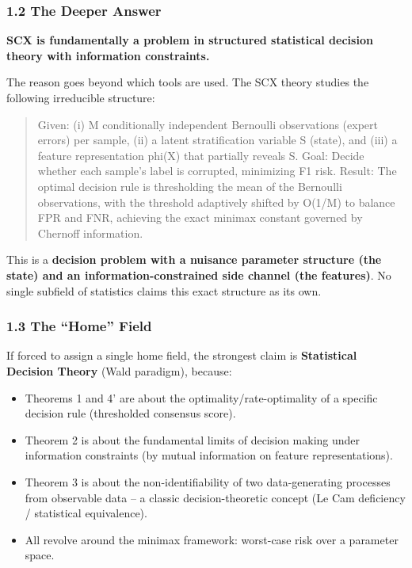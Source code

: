 \documentclass[
  12pt,
]{article}
\providecommand{\tightlist}{%
  \setlength{\itemsep}{0pt}\setlength{\parskip}{0pt}}
\begin{document}
\subsubsection{1.2 The Deeper Answer}\label{the-deeper-answer}

\textbf{SCX is fundamentally a problem in structured statistical
decision theory with information constraints.}

The reason goes beyond which tools are used. The SCX theory studies the
following irreducible structure:

\begin{quote}
Given: (i) M conditionally independent Bernoulli observations (expert
errors) per sample, (ii) a latent stratification variable S (state), and
(iii) a feature representation phi(X) that partially reveals S. Goal:
Decide whether each sample's label is corrupted, minimizing F1 risk.
Result: The optimal decision rule is thresholding the mean of the
Bernoulli observations, with the threshold adaptively shifted by O(1/M)
to balance FPR and FNR, achieving the exact minimax constant governed by
Chernoff information.
\end{quote}

This is a \textbf{decision problem with a nuisance parameter structure
(the state) and an information-constrained side channel (the features)}.
No single subfield of statistics claims this exact structure as its own.

\subsubsection{1.3 The ``Home'' Field}\label{the-home-field}

If forced to assign a single home field, the strongest claim is
\textbf{Statistical Decision Theory} (Wald paradigm), because:

\begin{itemize}
\tightlist
\item
  Theorems 1 and 4' are about the optimality/rate-optimality of a
  specific decision rule (thresholded consensus score).
\item
  Theorem 2 is about the fundamental limits of decision making under
  information constraints (by mutual information on feature
  representations).
\item
  Theorem 3 is about the non-identifiability of two data-generating
  processes from observable data -- a classic decision-theoretic concept
  (Le Cam deficiency / statistical equivalence).
\item
  All revolve around the minimax framework: worst-case risk over a
  parameter space.
\end{itemize}
\end{document}
